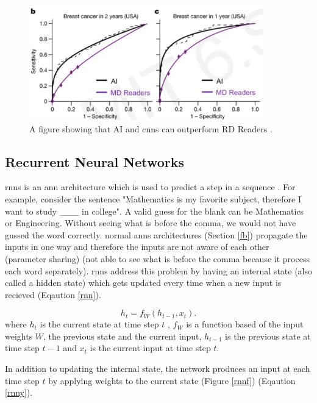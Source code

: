 \documentclass[runningheads]{llncs}
\begin{document}
\begin{figure}[H]
    \label{can}
    \centering
    \includegraphics[height=5cm]{cancer}
    \caption{A figure showing that AI and \gls{cnns} can outperform RD Readers \cite{mitlecthree}.}
\end{figure}



\subsection{Recurrent Neural Networks}

\gls{rnns} is an \gls{ann} architecture which is used to predict a step in a sequence \cite{hochreiter1997long}.
For example, consider the sentence "Mathematics is my favorite subject, therefore I want to study \_\_\_ in college".
A valid guess for the blank can be Mathematics or Engineering. Without seeing
what is before the comma, we would not have gussed the word correctly.
normal \gls{anns} architectures (Section \ref{fb}) propagate the inputs in one way and therefore 
the inputs are not aware of each other (parameter sharing) 
(not able to see what is before the comma because it process each word separately).
\gls{rnns} address this problem by having an internal state (also called a hidden state) which gets 
updated every time when a new input is recieved (Eqaution \ref{rnn}). 

\begin{equation}
    \label{rnn}
    h_{t} = f_{W}(h_{t-1}, x_{t}).
\end{equation}
where $h_{t}$ is the current state at time step $t$ , $f_{W}$ is a function
based of the input weights $W$, the previous state and the current input,  
$h_{t-1}$ is the previous state at time step $t-1$ and $x_{t}$ is the current input at time step $t$. 

In addition to updating the internal state, the network produces an input at each
time step $t$ by applying weights to the current state (Figure \ref{rnnf}) (Eqaution \ref{rnny}).
\end{document}
